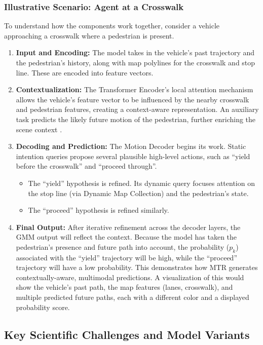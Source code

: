 \subsubsection{Illustrative Scenario: Agent at a Crosswalk}
To understand how the components work together, consider a vehicle approaching a crosswalk where a pedestrian is present.
\begin{enumerate}
    \item \textbf{Input and Encoding:} The model takes in the vehicle's past trajectory and the pedestrian's history, along with map polylines for the crosswalk and stop line. These are encoded into feature vectors.
    \item \textbf{Contextualization:} The Transformer Encoder's local attention mechanism allows the vehicle's feature vector to be influenced by the nearby crosswalk and pedestrian features, creating a context-aware representation. An auxiliary task predicts the likely future motion of the pedestrian, further enriching the scene context \cite{Shi2022MTR}.
    \item \textbf{Decoding and Prediction:} The Motion Decoder begins its work. Static intention queries propose several plausible high-level actions, such as ``yield before the crosswalk'' and ``proceed through''.
    \begin{itemize}
        \item The ``yield'' hypothesis is refined. Its dynamic query focuses attention on the stop line (via Dynamic Map Collection) and the pedestrian's state.
        \item The ``proceed'' hypothesis is refined similarly.
    \end{itemize}
    \item \textbf{Final Output:} After iterative refinement across the decoder layers, the GMM output will reflect the context. Because the model has taken the pedestrian's presence and future path into account, the probability ($p_k$) associated with the ``yield'' trajectory will be high, while the ``proceed'' trajectory will have a low probability. This demonstrates how MTR generates contextually-aware, multimodal predictions. A visualization of this would show the vehicle's past path, the map features (lanes, crosswalk), and multiple predicted future paths, each with a different color and a displayed probability score.
\end{enumerate}

\subsection{Key Scientific Challenges and Model Variants}

